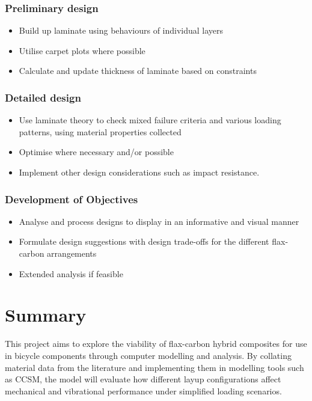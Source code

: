 \documentclass[9pt,twocolumn,twoside]{article}
\begin{document}
\subsubsection{Preliminary design}

\begin{itemize}
    \item Build up laminate using behaviours of individual layers
    \item Utilise carpet plots where possible
    \item Calculate and update thickness of laminate based on constraints
\end{itemize}

\subsubsection{Detailed design}

\begin{itemize}
    \item Use laminate theory to check mixed failure criteria and various loading patterns, using material properties collected
    \item Optimise where necessary and/or possible
    \item Implement other design considerations such as impact resistance.
\end{itemize}

\subsubsection{Development of Objectives}

\begin{itemize}
    \item Analyse and process designs to display in an informative and visual manner
    \item Formulate design suggestions with design trade-offs for the different flax-carbon arrangements
    \item Extended analysis if feasible
\end{itemize}


\section{Summary}

This project aims to explore the viability of flax-carbon hybrid composites for use in bicycle components through computer modelling and analysis. By collating material data from the literature and implementing them in modelling tools such as CCSM, the model will evaluate how different layup configurations affect mechanical and vibrational performance under simplified loading scenarios. 
\end{document}
